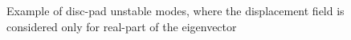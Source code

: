  \begin{figure}[h!]
    \centering
    \caption{Example of disc-pad unstable modes, where the displacement field is considered only for real-part of the eigenvector}
    \label{fig:unstable_modes}
\end{figure}

